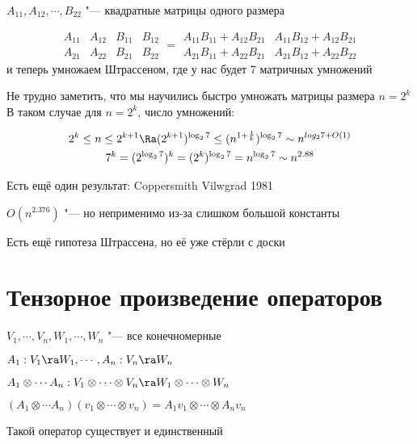 $A_{11}, A_{12}, \cdots, B_{22}$  "--- квадратные матрицы одного размера

$$\begin{matrix}
        A_{11} & A_{12} \\
        A_{21} & A_{22}
    \end{matrix}
    \begin{matrix}
        B_{11} & B_{12} \\
        B_{21} & B_{22}
    \end{matrix} = 
    \begin{matrix}
        A_{11}B_{11} + A_{12}B_{21} & A_{11}B_{12} + A_{12}B_{21} \\
        A_{21}B_{11} + A_{22}B_{21} & A_{21}B_{12} + A_{22}B_{22}
    \end{matrix}$$
и теперь умножаем Штрассеном, где у нас будет 7 матричных умножений

Не трудно заметить, что мы научились быстро умножать матрицы размера $n = 2^k$
В таком случае для $n = 2^k$, число умножений:

    \begin{gather*}
        2^k \leq n \leq 2^{k+1} \Ra (2^{k+1})^{\log_2 7} \leq (n^{1 + \frac{1}{k}})^{\log_2 7} \sim n^{log_2 7 + O(1)} \\
        7^k = (2^{\log_2 7})^k = (2^k)^{\log_2 7} = n^{\log_2 7} \sim n^{2.88}
    \end{gather*}

Есть ещё один результат: Coppersmith Vilwgrad 1981

$O(n^{2.376})$ "--- но неприменимо из-за слишком большой константы

Есть ещё гипотеза Штрассена, но её уже стёрли с доски

\section{Тензорное произведение операторов}

$V_1, \cdots, V_n, W_1, \cdots, W_n$ "--- все конечномерные

$A_1: V_1 \ra W_1, \cdots, A_n: V_n \ra W_n$

$A_1 \otimes \cdots A_n: V_1 \otimes \cdots \otimes V_n \ra W_1 \otimes \cdots \otimes W_n$

$(A_1 \otimes \cdots A_n)(v_1 \otimes \cdots \otimes v_n) = A_1 v_1 \otimes \cdots \otimes A_n v_n$

\begin{theorem}
    Такой оператор существует и единственный
\end{theorem}

